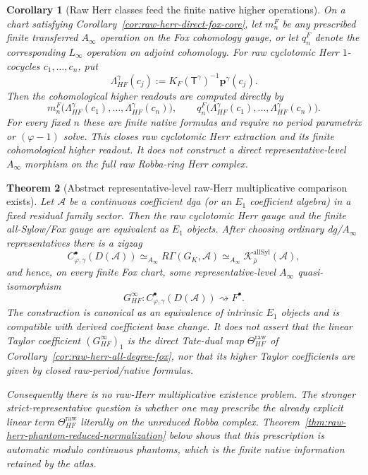 \documentclass[11pt]{article}
\newtheorem{theorem}{Theorem}[section]
\newtheorem{corollary}[theorem]{Corollary}
\theoremstyle{definition}
\begin{document}
\begin{corollary}[Raw Herr classes feed the finite native higher operations]\label{cor:raw-herr-higher-readout-core}
On a chart satisfying Corollary~\ref{cor:raw-herr-direct-fox-core}, let $m_n^{F}$ be any prescribed finite transferred $A_\infty$ operation on the Fox cohomology gauge, or let $q_n^{F}$ denote the corresponding $L_\infty$ operation on adjoint cohomology.  For raw cyclotomic Herr $1$-cocycles $c_1,\ldots,c_n$, put
\[
 \Lambda_{HF}^{\gamma}(c_j)
 :=K_F(\mathsf T^{\gamma})^{-1}\mathbf p^{\gamma}(c_j).
\]
Then the cohomological higher readouts are computed directly by
\[
 m_n^{F}\bigl(\Lambda_{HF}^{\gamma}(c_1),\ldots,
                 \Lambda_{HF}^{\gamma}(c_n)\bigr),
 \qquad
 q_n^{F}\bigl(\Lambda_{HF}^{\gamma}(c_1),\ldots,
                 \Lambda_{HF}^{\gamma}(c_n)\bigr).
\]
For every fixed $n$ these are finite native formulas and require no period parametrix or $(\varphi-1)$ solve.  This closes raw cyclotomic Herr extraction and its finite cohomological higher readout.  It does not construct a direct representative-level $A_\infty$ morphism on the full raw Robba-ring Herr complex.
\end{corollary}


\begin{theorem}[Abstract representative-level raw-Herr multiplicative comparison exists]\label{thm:raw-herr-abstract-ainfty-existence}
Let $\mathcal A$ be a continuous coefficient dga (or an $E_1$ coefficient
algebra) in a fixed residual family sector.  Then the raw cyclotomic Herr gauge
and the finite all-Sylow/Fox gauge are equivalent as $E_1$ objects.  After
choosing ordinary dg/$A_\infty$ representatives there is a zigzag
\begin{equation}\label{eq:raw-herr-abstract-ainfty-zigzag}
 C^\bullet_{\varphi,\gamma}(D(\mathcal A))
 \simeq_{A_\infty}
 R\Gamma(G_K,\mathcal A)
 \simeq_{A_\infty}
 \mathcal K_{\bar\rho}^{\mathrm{allSyl}}(\mathcal A),
\end{equation}
and hence, on every finite Fox chart, some representative-level
$A_\infty$ quasi-isomorphism
\begin{equation}\label{eq:raw-herr-some-ainfty-map}
 G_{HF}^\infty:
 C^\bullet_{\varphi,\gamma}(D(\mathcal A))
 \rightsquigarrow F^\bullet.
\end{equation}
The construction is canonical as an equivalence of intrinsic $E_1$ objects and
is compatible with derived coefficient base change.  It does not assert that the
linear Taylor coefficient $(G_{HF}^\infty)_1$ is the direct Tate-dual map
$\Theta_{HF}^{\mathrm{raw}}$ of
Corollary~\ref{cor:raw-herr-all-degree-fox}, nor that its higher Taylor
coefficients are given by closed raw-period/native formulas.

Consequently there is no raw-Herr multiplicative existence problem.  The
stronger strict-representative question is whether one may prescribe the already
explicit linear term $\Theta_{HF}^{\mathrm{raw}}$ literally on the unreduced
Robba complex.  Theorem~\ref{thm:raw-herr-phantom-reduced-normalization} below
shows that this prescription is automatic modulo continuous phantoms, which is
the finite native information retained by the atlas.
\end{theorem}
\end{document}
